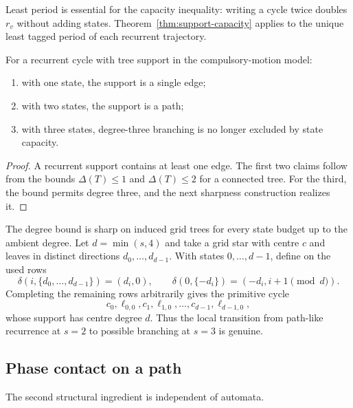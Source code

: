 Least period is essential for the capacity inequality: writing a cycle twice doubles $r_v$ without adding states. Theorem~\ref{thm:support-capacity} applies to the unique least tagged period of each recurrent trajectory.

\begin{corollary}\label{cor:low-state-tree-supports}
For a recurrent cycle with tree support in the compulsory-motion model:
\begin{enumerate}[label=(\roman*),leftmargin=2em]
 \item with one state, the support is a single edge;
 \item with two states, the support is a path;
 \item with three states, degree-three branching is no longer excluded by state capacity.
\end{enumerate}
\end{corollary}
\begin{proof}
A recurrent support contains at least one edge.  The first two claims follow from the bounds $\Delta(T)\le1$ and $\Delta(T)\le2$ for a connected tree.  For the third, the bound permits degree three, and the next sharpness construction realizes it.
\end{proof}

The degree bound is sharp on induced grid trees for every state budget up to the ambient degree.  Let $d=\min(s,4)$ and take a grid star with centre $c$ and leaves in distinct directions $d_0,\ldots,d_{d-1}$.  With states $0,\ldots,d-1$, define on the used rows
\[
 \delta(i,\{d_0,\ldots,d_{d-1}\})=(d_i,0),
 \qquad
 \delta(0,\{-d_i\})=(-d_i,i+1\!\!\pmod d).
\]
Completing the remaining rows arbitrarily gives the primitive cycle
\[
 c_0,\ell_{0,0},c_1,\ell_{1,0},\ldots,c_{d-1},\ell_{d-1,0},
\]
whose support has centre degree $d$.  Thus the local transition from path-like recurrence at $s=2$ to possible branching at $s=3$ is genuine.



\subsection{Phase contact on a path}

The second structural ingredient is independent of automata.

